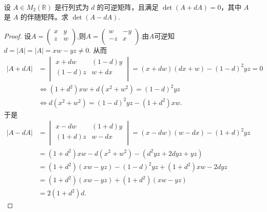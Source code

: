 \documentclass[../../main.tex]{subfiles}%
\begin{document}
\begin{example}
设 $A \in M_2(\mathbb{R})$ 是行列式为 $d$ 的可逆矩阵，且满足 $\det(A + dA ) = 0$，其中 $A$ 是 $A$ 的伴随矩阵。求 $\det(A - dA ).$
\end{example}
\begin{proof}
设$A=\begin{pmatrix}
x&		y\\
z&		w\\
\end{pmatrix}$,则$A=\begin{pmatrix}
w&		-y\\
-z&		x\\
\end{pmatrix}$.由$A$可逆知
$d=|A|=|A|=xw-yz\ne 0.$
从而
\begin{align*}
|A+dA|&=\begin{vmatrix}
x+dw&		(1-d) y\\
(1-d) z&		w+dx\\
\end{vmatrix}=(x+dw)(dx+w)-(1-d)^2yz=0
\\
&\Longleftrightarrow (1+d^2)xw+d(x^2+w^2)=(1-d)^2yz
\\
&\Longleftrightarrow d(x^2+w^2)=(1-d)^2yz-(1+d^2)xw.
\end{align*}
于是
\begin{align*}
|A-dA|&=\begin{vmatrix}
x-dw&		(1+d) y\\
(1+d) z&		w-dx\\
\end{vmatrix}=(x-dw)(w-dx)-(1+d)^2yz
\\
&=(1+d^2)xw-d(x^2+w^2)-(d^2yz+2dyz+yz)
\\
&=(1+d^2)(xw-yz)-(1-d)^2yz+(1+d^2)xw-2dyz
\\
&=(1+d^2)(xw-yz)+(1+d^2)(xw-yz)
\\
&=2(1+d^2)d.
\end{align*}
\end{proof}
\end{document}
